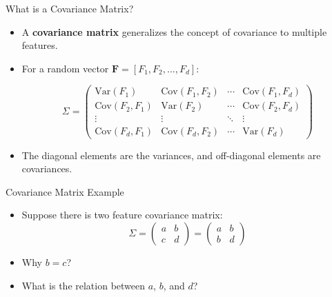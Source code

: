 \documentclass[serif, aspectratio=169]{beamer}
\begin{document}

\begin{frame}{What is a Covariance Matrix?}
    \begin{itemize}         
        \item A \textbf{covariance matrix} generalizes the concept of covariance to multiple features.
        
\item For a random vector $\mathbf{F} = [F_1, F_2, \dots, F_d]$:

$$
\Sigma = 
\begin{pmatrix}
\text{Var}(F_1) & \text{Cov}(F_1, F_2) & \cdots & \text{Cov}(F_1, F_d) \\
\text{Cov}(F_2, F_1) & \text{Var}(F_2) & \cdots & \text{Cov}(F_2, F_d) \\
\vdots & \vdots & \ddots & \vdots \\
\text{Cov}(F_d, F_1) & \text{Cov}(F_d, F_2) & \cdots & \text{Var}(F_d)
\end{pmatrix}
$$

\item The diagonal elements are the variances, and off-diagonal elements are covariances.
    \end{itemize}
\end{frame}


\begin{frame}{Covariance Matrix Example}
    \begin{itemize}         
        \item Suppose there is two feature covariance matrix:
$$
\Sigma = 
\begin{pmatrix}
a & b  \\
c & d 
\end{pmatrix} = \begin{pmatrix}
a & b   \\
b & d 
\end{pmatrix}
$$

        \item Why $b = c $?
        \item What is the relation between $a$, $b$, and $d $?
    \end{itemize}
\end{frame}
\end{document}
